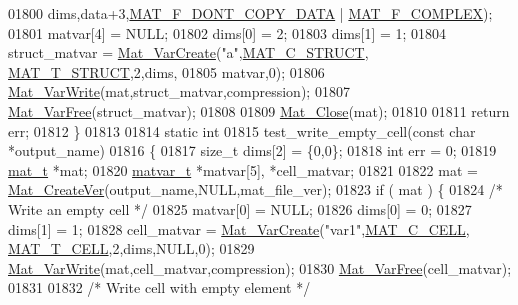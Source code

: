 \begin{DoxyCode}
{{{{{01800                    dims,data+3,\hyperlink{group___m_a_t_ggab9d6ef9e3ddca78a317b173f01d53fbba762244499f52eb35e7b53fb79a1f2889}{MAT\_F\_DONT\_COPY\_DATA} | 
      \hyperlink{group___m_a_t_ggab9d6ef9e3ddca78a317b173f01d53fbbacd7b091a11184aad7fc6078c04470780}{MAT\_F\_COMPLEX});
01801     matvar[4] = NULL;
01802     dims[0] = 2;
01803     dims[1] = 1;
01804     struct\_matvar = \hyperlink{group___m_a_t_ga1c54a84bb4d810c6fccdb8869489eac4}{Mat\_VarCreate}(\textcolor{stringliteral}{"a"},\hyperlink{group___m_a_t_ggad4d60ae7b709fc81bfd744fb4c857c40acb467c7749c80902b798134c729bb521}{MAT\_C\_STRUCT},
      \hyperlink{group___m_a_t_ggacf7b3b879282b7ab3a51190e49bf3453a4f4d5a6e1d42c6aa81ffb810e5da5c85}{MAT\_T\_STRUCT},2,dims,
01805                                   matvar,0);
01806     \hyperlink{group___m_a_t_ga4bd3eba12df415d8226e27c457fbbb0b}{Mat\_VarWrite}(mat,struct\_matvar,compression);
01807     \hyperlink{group___m_a_t_ga1d14716f7450530fd1c9d02413787f0e}{Mat\_VarFree}(struct\_matvar);
01808 
01809     \hyperlink{group___m_a_t_ga101c92ff7bde4a2d4615661beba09262}{Mat\_Close}(mat);
01810 
01811     \textcolor{keywordflow}{return} err;
01812 \}
01813 
01814 \textcolor{keyword}{static} \textcolor{keywordtype}{int}
01815 test\_write\_empty\_cell(\textcolor{keyword}{const} \textcolor{keywordtype}{char} *output\_name)
01816 \{
01817     \textcolor{keywordtype}{size\_t}  dims[2] = \{0,0\};
01818     \textcolor{keywordtype}{int}    err = 0;
01819     \hyperlink{struct__mat__t}{mat\_t}     *mat;
01820     \hyperlink{group___m_a_t_structmatvar__t}{matvar\_t} *matvar[5], *cell\_matvar;
01821 
01822     mat = \hyperlink{group___m_a_t_ga22d404f203af7869c841400e7ad247cf}{Mat\_CreateVer}(output\_name,NULL,mat\_file\_ver);
01823     \textcolor{keywordflow}{if} ( mat ) \{
01824         \textcolor{comment}{/* Write an empty cell */}
01825         matvar[0] = NULL;
01826         dims[0] = 0;
01827         dims[1] = 1;
01828         cell\_matvar = \hyperlink{group___m_a_t_ga1c54a84bb4d810c6fccdb8869489eac4}{Mat\_VarCreate}(\textcolor{stringliteral}{"var1"},\hyperlink{group___m_a_t_ggad4d60ae7b709fc81bfd744fb4c857c40a2f7abb47a1c51e248bd4e5e03cc81b08}{MAT\_C\_CELL},
      \hyperlink{group___m_a_t_ggacf7b3b879282b7ab3a51190e49bf3453a07599cf2cca6d2b2d059378563318ba5}{MAT\_T\_CELL},2,dims,NULL,0);
01829         \hyperlink{group___m_a_t_ga4bd3eba12df415d8226e27c457fbbb0b}{Mat\_VarWrite}(mat,cell\_matvar,compression);
01830         \hyperlink{group___m_a_t_ga1d14716f7450530fd1c9d02413787f0e}{Mat\_VarFree}(cell\_matvar);
01831 
01832         \textcolor{comment}{/* Write cell with empty element */}
}}}}}
\end{DoxyCode}
